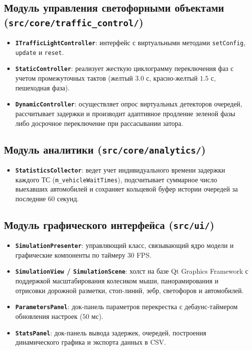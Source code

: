 \documentclass[11pt, a4paper]{article}
\begin{document}
\subsection{Модуль управления светофорными объектами (\texttt{src/core/traffic\_control/})}
\begin{itemize}
  \item \textbf{\texttt{ITrafficLightController}}: интерфейс с виртуальными методами \texttt{setConfig}, \texttt{update} и \texttt{reset}.
  \item \textbf{\texttt{StaticController}}: реализует жесткую циклограмму переключения фаз с учетом промежуточных тактов (желтый $3.0\text{ с}$, красно-желтый $1.5\text{ с}$, пешеходная фаза).
  \item \textbf{\texttt{DynamicController}}: осуществляет опрос виртуальных детекторов очередей, рассчитывает задержки и производит адаптивное продление зеленой фазы либо досрочное переключение при рассасывании затора.
\end{itemize}

\subsection{Модуль аналитики (\texttt{src/core/analytics/})}
\begin{itemize}
  \item \textbf{\texttt{StatisticsCollector}}: ведет учет индивидуального времени задержки каждого ТС (\texttt{m\_vehicleWaitTimes}), подсчитывает суммарное число выехавших автомобилей и сохраняет кольцевой буфер истории очередей за последние 60 секунд.
\end{itemize}

\subsection{Модуль графического интерфейса (\texttt{src/ui/})}
\begin{itemize}
  \item \textbf{\texttt{SimulationPresenter}}: управляющий класс, связывающий ядро модели и графические компоненты по таймеру 30 FPS.
  \item \textbf{\texttt{SimulationView} / \texttt{SimulationScene}}: холст на базе Qt Graphics Framework с поддержкой масштабирования колесиком мыши, панорамирования и отрисовки дорожной разметки, стоп-линий, зебр, светофоров и автомобилей.
  \item \textbf{\texttt{ParametersPanel}}: док-панель параметров перекрестка с дебаунс-таймером обновления настроек ($50\text{ мс}$).
  \item \textbf{\texttt{StatsPanel}}: док-панель вывода задержек, очередей, построения динамического графика и экспорта данных в CSV.
\end{itemize}
\end{document}
